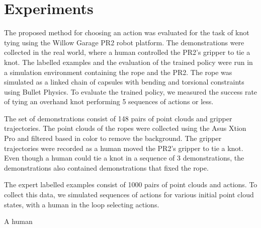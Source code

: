 \section{Experiments}

The proposed method for choosing an action was evaluated for the task of knot tying using the Willow Garage PR2 robot platform. 
The demonstrations were collected in the real world, where a human controlled the PR2's gripper to tie a knot.
The labelled examples and the evaluation of the trained policy were run in a simulation environment containing the rope and the PR2.
The rope was simulated as a linked chain of capsules with bending and torsional constraints using Bullet Physics.
To evaluate the trained policy, we measured the success rate of tying an overhand knot performing 5 sequences of actions or less.

The set of demonstrations consist of 148 pairs of point clouds and gripper trajectories.
The point clouds of the ropes were collected using the Asus Xtion Pro and filtered based in color to remove the background.
The gripper trajectories were recorded as a human moved the PR2's gripper to tie a knot.
Even though a human could tie a knot in a sequence of 3 demonstrations, the demonstrations also contained demonstrations that fixed the rope.

The expert labelled examples consist of 1000 pairs of point clouds and actions.
To collect this data, we simulated sequences of actions for various initial point cloud states, with a human in the loop selecting actions.

A human 


